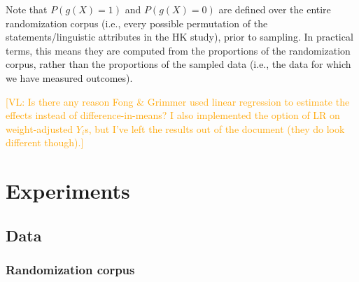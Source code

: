 \documentclass{article}
\newcommand{\vl}[1]{\textcolor{orange}{[VL: #1]}}
\begin{document}
\begin{enumerate}
    Note that $P(g(X)=1)$ and $P(g(X)=0)$ are defined over the entire randomization corpus (i.e., every possible permutation of the statements/linguistic attributes in the HK study), prior to sampling. In practical terms, this means they are computed from the  proportions of the randomization corpus, rather than the  proportions of the sampled data (i.e., the data for which we have measured outcomes).
\end{enumerate}

\vl{Is there any reason Fong & Grimmer used linear regression to estimate the effects instead of difference-in-means? I also implemented the option of LR on weight-adjusted $Y_i$s, but I've left the results out of the document (they do look different though).}

\section{Experiments}

\subsection{Data}

\subsubsection{Randomization corpus}
\end{document}
